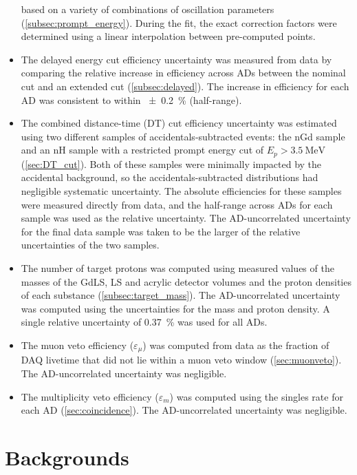 \begin{itemize}
        based on a variety of combinations of oscillation parameters
        (\cref{subsec:prompt_energy}).
        During the fit, the exact correction factors were determined
        using a linear interpolation between pre-computed points.
    \item The delayed energy cut efficiency uncertainty
        was measured from data by comparing the relative increase in efficiency
        across ADs between the nominal cut and an extended cut
        (\cref{subsec:delayed}).
        The increase in efficiency for each AD was consistent to within
        \SI{\pm 0.2}{\percent} (half-range).
    \item The combined distance-time (DT) cut efficiency uncertainty
        was estimated using two different samples of accidentals-subtracted events:
        the nGd sample and an nH sample with a restricted prompt energy cut
        of $E_p > \SI{3.5}{\MeV}$ (\cref{sec:DT_cut}).
        Both of these samples were minimally impacted by the accidental background,
        so the accidentals-subtracted distributions
        had negligible systematic uncertainty.
        The absolute efficiencies for these samples were measured directly from data,
        and the half-range across ADs for each sample
        was used as the relative uncertainty.
        The AD-uncorrelated uncertainty for the final data sample
        was taken to be the larger of the relative uncertainties
        of the two samples.
    \item The number of target protons was computed using measured values
        of the masses of the GdLS, LS and acrylic detector volumes
        and the proton densities of each substance (\cref{subsec:target_mass}).
        The AD-uncorrelated uncertainty was computed
        using the uncertainties for the mass and proton density.
        A single relative uncertainty of \SI{0.37}{\percent} was used for all ADs.
    \item The muon veto efficiency ($\varepsilon_\mu$) was computed from data
        as the fraction of DAQ livetime that did not lie within a muon veto window
        (\cref{sec:muonveto}).
        The AD-uncorrelated uncertainty was negligible.
    \item The multiplicity veto efficiency ($\varepsilon_m$) was computed
        using the singles rate for each AD (\cref{sec:coincidence}).
        The AD-uncorrelated uncertainty was negligible.
\end{itemize}

\section{Backgrounds}
\label{sec:summary_bg}

